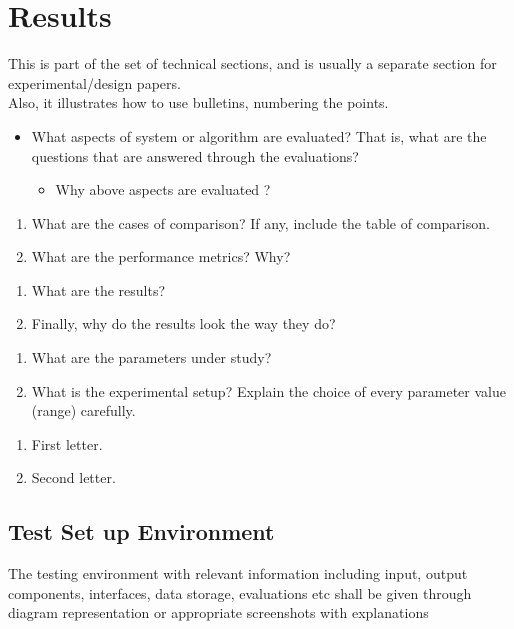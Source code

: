 \chapter{Results}

This is part of the set of technical sections, and is usually a separate section for experimental/design papers.\\
Also, it illustrates how to use bulletins, numbering the points.

\begin{itemize} 
	\item What aspects of system or algorithm are evaluated? That is, what are the questions that are answered through the evaluations? 
		\begin{itemize}
			\item Why above aspects are evaluated ? 
		\end{itemize}
\end{itemize}

\begin{enumerate}[label=\Roman*]
	\item What are the cases of comparison? If any, include the table of comparison.
	\item What are the performance metrics? Why? 
\end{enumerate}

\begin{enumerate}[label=\roman*]
	\item What are the results? 
	\item Finally, why do the results look the way they do?
\end{enumerate}

\begin{enumerate}
	\item What are the parameters under study? 
	\item What is the experimental setup? Explain the choice of every parameter value (range) carefully. 
\end{enumerate}


\begin{enumerate}[label=\alph*]
	\item First letter.
	\item Second letter.
\end{enumerate}

\section{Test Set up Environment}
The testing environment with relevant information including input, output components, interfaces, data storage, evaluations etc shall be given through diagram representation or appropriate screenshots with explanations \\

